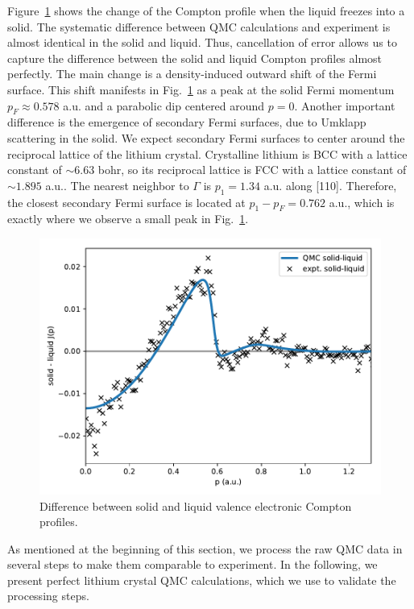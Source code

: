 \documentclass[aps,prb,showpacs,preprintnumbers,amsmath,amssymb,superscriptaddress,twocolumn]{revtex4-1}
\begin{document}
Figure~\ref{fig:s-l-djp} shows the change of the Compton profile when the liquid freezes into a solid. The systematic difference  between QMC calculations and experiment is almost identical in the solid and liquid. Thus, cancellation of error allows us to capture the difference between the solid and liquid Compton profiles almost perfectly.
The main change is a density-induced outward shift of the Fermi surface. This shift manifests in Fig.~\ref{fig:s-l-djp} as a peak at the solid Fermi momentum $p_F\approx0.578$ a.u. and a parabolic dip centered around $p=0$. Another important difference is the emergence of secondary Fermi surfaces, due to Umklapp scattering in the solid. We expect secondary Fermi surfaces to center around the reciprocal lattice of the lithium crystal. Crystalline lithium is BCC with a lattice constant of $\sim 6.63$ bohr, so its reciprocal lattice is FCC with a lattice constant of $\sim 1.895$ a.u.. The nearest neighbor to $\Gamma$ is $p_1=1.34$ a.u.  along [110]. Therefore, the closest secondary Fermi surface is located at $p_1-p_F=0.762$ a.u., which is exactly where we observe a small peak in Fig.~\ref{fig:s-l-djp}.

\begin{figure}[h]
\includegraphics[width=\linewidth]{li52e_sl-djp}
\caption{Difference between solid and liquid valence electronic Compton profiles.\label{fig:s-l-djp}}
\end{figure}

As mentioned at the beginning of this section, we process the raw QMC data in several steps to make them comparable to experiment. In the following, we present perfect lithium crystal QMC calculations, which we use to validate the processing steps.
\end{document}
